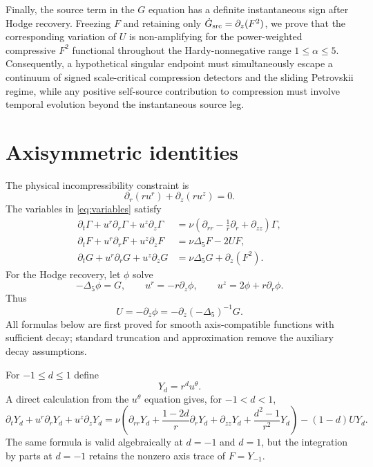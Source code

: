 \documentclass[11pt]{article}
\numberwithin{equation}{section}
\theoremstyle{definition}
\newcommand{\Gam}{\Gamma}
\newcommand{\lapfive}{\Delta_5}
\begin{document}
Finally, the source term in the $G$ equation has a definite instantaneous sign after Hodge recovery.  Freezing $F$ and retaining only $\dot G_{\rm src}=\partial_z(F^2)$, we prove that the corresponding variation of $U$ is non-amplifying for the power-weighted compressive $F^2$ functional throughout the Hardy-nonnegative range $1\le\alpha\le5$.  Consequently, a hypothetical singular endpoint must simultaneously escape a continuum of signed scale-critical compression detectors and the sliding Petrovskii regime, while any positive self-source contribution to compression must involve temporal evolution beyond the instantaneous source leg.

\section{Axisymmetric identities}

The physical incompressibility constraint is
\begin{equation}\label{eq:divphys}
 \partial_r(ru^r)+\partial_z(ru^z)=0.
\end{equation}
The variables in \eqref{eq:variables} satisfy
\begin{align}
 \partial_t\Gam+u^r\partial_r\Gam+u^z\partial_z\Gam
 &=\nu\left(\partial_{rr}-\frac1r\partial_r+\partial_{zz}\right)\Gam,
 \label{eq:Gamma}\\
 \partial_tF+u^r\partial_rF+u^z\partial_zF
 &=\nu\lapfive F-2UF,
 \label{eq:F}\\
 \partial_tG+u^r\partial_rG+u^z\partial_zG
 &=\nu\lapfive G+\partial_z(F^2).
 \label{eq:G}
\end{align}
For the Hodge recovery, let $\phi$ solve
\begin{equation}\label{eq:Hodge}
 -\lapfive\phi=G,
 \qquad
 u^r=-r\partial_z\phi,
 \qquad
 u^z=2\phi+r\partial_r\phi.
\end{equation}
Thus
\begin{equation}\label{eq:U-Hodge}
 U=-\partial_z\phi=-\partial_z(-\lapfive)^{-1}G.
\end{equation}
All formulas below are first proved for smooth axis-compatible functions with sufficient decay; standard truncation and approximation remove the auxiliary decay assumptions.

For $-1\le d\le1$ define
\begin{equation}\label{eq:Yd}
 Y_d=r^d u^\theta.
\end{equation}
A direct calculation from the $u^\theta$ equation gives, for $-1<d<1$,
\begin{equation}\label{eq:Yd-PDE}
 \partial_tY_d+u^r\partial_rY_d+u^z\partial_zY_d
 =\nu\left(
 \partial_{rr}Y_d+\frac{1-2d}{r}\partial_rY_d+\partial_{zz}Y_d
 +\frac{d^2-1}{r^2}Y_d\right)
 -(1-d)UY_d.
\end{equation}
The same formula is valid algebraically at $d=-1$ and $d=1$, but the integration by parts at $d=-1$ retains the nonzero axis trace of $F=Y_{-1}$.
\end{document}
